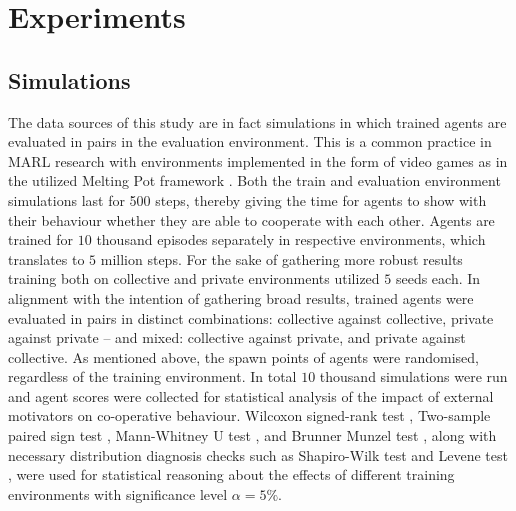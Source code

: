 \documentclass[preprint,12pt,authoryear]{elsarticle}
\begin{document}
\section{Experiments}
\subsection{Simulations}

The data sources of this study are in fact simulations in which trained agents are evaluated in pairs in the evaluation environment. This is a common practice in MARL research with environments implemented in the form of video games as in the utilized Melting Pot framework \citep{Leibo2021, agapiou2023meltingpot20}. Both the train and evaluation environment simulations last for 500 steps, thereby giving the time for agents to show with their behaviour whether they are able to cooperate with each other. Agents are trained for $10$ thousand episodes separately in respective environments, which translates to $5$ million steps. For the sake of gathering more robust results training both on collective and private environments utilized $5$ seeds each. 
In alignment with the intention of gathering broad results, trained agents were evaluated in pairs in distinct combinations: collective against collective, private against private -- and mixed: collective against private, and private against collective. As mentioned above, the spawn points of agents were randomised, regardless of the training environment. In total $10$ thousand simulations were run and agent scores were collected for statistical analysis of the impact of external motivators on co-operative behaviour. Wilcoxon signed-rank test \citep{Wilcoxon1945}, Two-sample paired sign test \citep{mendenhall1989nonparametric}, Mann-Whitney U test \citep{Mann1947}, and Brunner Munzel test \citep{Brunner2000}, along with necessary distribution diagnosis checks such as Shapiro-Wilk test \citep{Shapiro1965} and Levene test \citep{levene1960}, were used for statistical reasoning about the effects of different training environments with significance level $\alpha=5\%$. 
\end{document}
